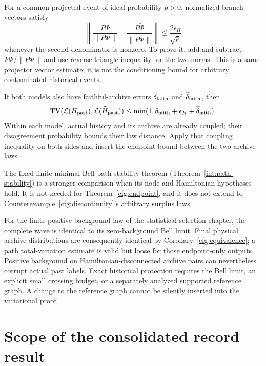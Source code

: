 \documentclass[11pt,oneside,openany]{book}
\theoremstyle{definition}
\theoremstyle{remark}\newtheorem{remark}[theorem]{Remark}
\begin{document}
For a common projected event of ideal probability $p>0$, normalized branch
vectors satisfy
\[
 \left\|\frac{P\Phi}{\|P\Phi\|}
          -\frac{P\widetilde\Phi}{\|P\widetilde\Phi\|}\right\|
 \le \frac{2\epsilon_H}{\sqrt p}
\]
whenever the second denominator is nonzero. To prove it, add and subtract
$P\widetilde\Phi/\|P\Phi\|$ and use reverse triangle inequality for the
two norms. This is a same-projector vector estimate; it is not the
conditioning bound for arbitrary contaminated historical events.

If both models also have faithful-archive errors
$\delta_{\rm faith}$ and $\widetilde\delta_{\rm faith}$, then
\begin{equation}
 \operatorname{TV}(\mathcal L(H_{\rm past}),
                  \mathcal L(\widetilde H_{\rm past}))
 \le \min(1,\delta_{\rm faith}+\epsilon_H
                    +\widetilde\delta_{\rm faith}).
 \label{cfg:historycompare}
\end{equation}
Within each model, actual history and its archive are already coupled;
their disagreement probability bounds their law distance. Apply that
coupling inequality on both sides and insert the endpoint bound between
the two archive laws.

The fixed finite minimal Bell path-stability theorem
(Theorem~\ref{int:path-stability}) is a stronger comparison when its
node and Hamiltonian hypotheses hold. It is not needed for
Theorem~\ref{cfg:endpoint}, and it does not extend to
Counterexample~\ref{cfg:discontinuity}'s arbitrary surplus laws.

For the finite positive-background law of the statistical selection
chapter, the complete wave is identical to its zero-background Bell limit.
Final physical archive distributions are consequently identical by
Corollary~\ref{cfg:equivalence}; a path total-variation estimate is valid
but loose for those endpoint-only outputs. Positive background on
Hamiltonian-disconnected archive pairs can nevertheless corrupt actual
past labels. Exact historical protection requires the Bell limit,
an explicit small crossing budget, or a separately analyzed supported
reference graph. A change to the reference graph cannot be silently
inserted into the variational proof.

\section{Scope of the consolidated record result}
\end{document}

